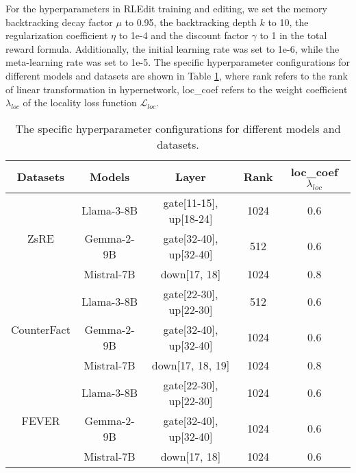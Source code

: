 For the hyperparameters in RLEdit training and editing, we set the memory backtracking decay factor $\mu$ to 0.95, the backtracking depth $k$ to 10, the regularization coefficient $\eta$ to 1e-4 and the discount factor $\gamma$ to 1 in the total reward formula. Additionally, the initial learning rate was set to 1e-6, while the meta-learning rate was set to 1e-5. The specific hyperparameter configurations for different models and datasets are shown in Table \ref{tab:hyperparameter},  where rank refers to the rank of linear transformation in hypernetwork, loc\_coef refers to the weight coefficient $\lambda_{loc}$ of the locality loss function $\mathcal{L}_\textit{loc}$.

\begin{table}[ht]
\centering
\caption{The specific hyperparameter configurations for different models and datasets.}
\label{tab:hyperparameter}
\begin{tabular}{ccccc}
\toprule[1.5pt]
\textbf{Datasets} & \textbf{Models} & \textbf{Layer} & \textbf{Rank} & \textbf{loc\_coef $\lambda_{loc}$} \\
\midrule
\multirow{3}{*}{ZsRE} & Llama-3-8B & gate[11-15], up[18-24] & 1024 & 0.6 \\  
 & Gemma-2-9B & gate[32-40], up[32-40] & 512 & 0.6 \\  
 & Mistral-7B & down[17, 18] & 1024 & 0.8 \\ \midrule
\multirow{3}{*}{CounterFact} & Llama-3-8B & gate[22-30], up[22-30] & 512 & 0.6 \\  
 & Gemma-2-9B & gate[32-40], up[32-40] & 1024 & 0.6 \\ 
 & Mistral-7B & down[17, 18, 19] & 1024 & 0.8 \\ \midrule
\multirow{3}{*}{FEVER} & Llama-3-8B & gate[22-30], up[22-30] & 1024 & 0.6 \\  
 & Gemma-2-9B & gate[32-40], up[32-40] & 1024 & 0.6 \\ 
 & Mistral-7B & down[17, 18] & 1024 & 0.6 \\
 \bottomrule[1pt]
\end{tabular}
\end{table}


\newpage


